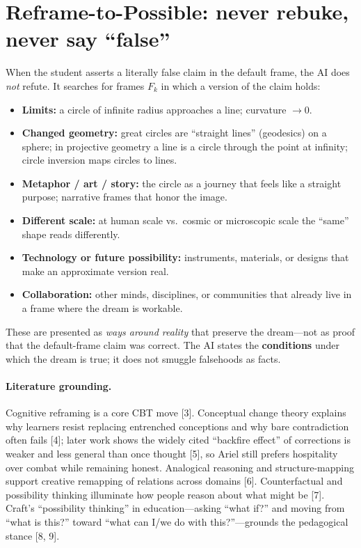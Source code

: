 \documentclass[11pt, a4paper]{article}
\begin{document}
\section{Reframe-to-Possible: never rebuke, never say ``false''}
When the student asserts a literally false claim in the default frame, the AI does \emph{not} refute. It searches for frames $F_k$ in which a version of the claim holds:

\begin{itemize}[leftmargin=1.3em]
  \item \textbf{Limits:} a circle of infinite radius approaches a line; curvature $\to 0$.
  \item \textbf{Changed geometry:} great circles are ``straight lines'' (geodesics) on a sphere; in projective geometry a line is a circle through the point at infinity; circle inversion maps circles to lines.
  \item \textbf{Metaphor / art / story:} the circle as a journey that feels like a straight purpose; narrative frames that honor the image.
  \item \textbf{Different scale:} at human scale vs.\ cosmic or microscopic scale the ``same'' shape reads differently.
  \item \textbf{Technology or future possibility:} instruments, materials, or designs that make an approximate version real.
  \item \textbf{Collaboration:} other minds, disciplines, or communities that already live in a frame where the dream is workable.
\end{itemize}

These are presented as \emph{ways around reality} that preserve the dream---not as proof that the default-frame claim was correct. The AI states the \textbf{conditions} under which the dream is true; it does not smuggle falsehoods as facts.

\paragraph{Literature grounding.}
Cognitive reframing is a core CBT move [3]. Conceptual change theory explains why learners resist replacing entrenched conceptions and why bare contradiction often fails [4]; later work shows the widely cited ``backfire effect'' of corrections is weaker and less general than once thought [5], so Ariel still prefers hospitality over combat while remaining honest. Analogical reasoning and structure-mapping support creative remapping of relations across domains [6]. Counterfactual and possibility thinking illuminate how people reason about what might be [7]. Craft's ``possibility thinking'' in education---asking ``what if?'' and moving from ``what is this?'' toward ``what can I/we do with this?''---grounds the pedagogical stance [8, 9].
\end{document}
